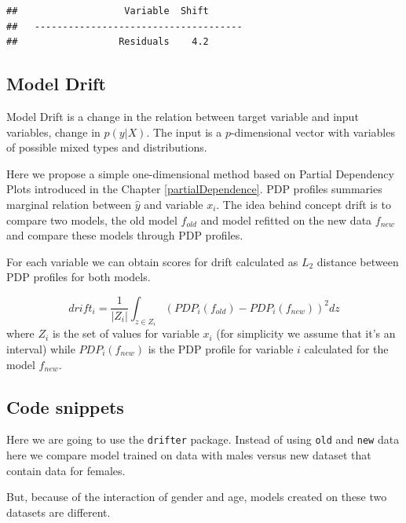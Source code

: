 \documentclass[]{krantz}
\theoremstyle{definition}
\theoremstyle{definition}
\theoremstyle{definition}
\theoremstyle{remark}
\begin{document}
\begin{verbatim}
##                   Variable  Shift
##   -------------------------------------
##                  Residuals    4.2
\end{verbatim}

\hypertarget{model-drift}{%
\subsection{Model Drift}\label{model-drift}}

Model Drift is a change in the relation between target variable and
input variables, change in \(p(y|X)\). The input is a \(p\)-dimensional
vector with variables of possible mixed types and distributions.

Here we propose a simple one-dimensional method based on Partial
Dependency Plots introduced in the Chapter \ref{partialDependence}. PDP
profiles summaries marginal relation between \(\hat y\) and variable
\(x_i\). The idea behind concept drift is to compare two models, the old
model \(f_{old}\) and model refitted on the new data \(f_{new}\) and
compare these models through PDP profiles.

For each variable we can obtain scores for drift calculated as \(L_2\)
distance between PDP profiles for both models.

\[
drift_{i} = \frac 1 {|Z_i|}\int_{z\in Z_i} (PDP_i(f_{old}) - PDP_i(f_{new}))^2 dz
\] where \(Z_i\) is the set of values for variable \(x_i\) (for
simplicity we assume that it's an interval) while \(PDP_i(f_{new})\) is
the PDP profile for variable \(i\) calculated for the model \(f_{new}\).

\hypertarget{code-snippets-4}{%
\subsection{Code snippets}\label{code-snippets-4}}

Here we are going to use the \texttt{drifter} package. Instead of using
\texttt{old} and \texttt{new} data here we compare model trained on data
with males versus new dataset that contain data for females.

But, because of the interaction of gender and age, models created on
these two datasets are different.
\end{document}
